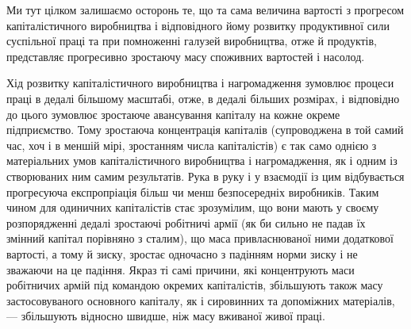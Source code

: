 Ми тут цілком залишаємо осторонь те, що та сама величина
вартості з прогресом капіталістичного виробництва і відповідного
йому розвитку продуктивної сили суспільної праці та при помноженні
галузей виробництва, отже й продуктів, представляє прогресивно
зростаючу масу споживних вартостей і насолод.

Хід розвитку капіталістичного виробництва і нагромадження
зумовлює процеси праці в дедалі більшому масштабі, отже, в дедалі
більших розмірах, і відповідно до цього зумовлює зростаюче
авансування капіталу на кожне окреме підприємство. Тому
зростаюча концентрація капіталів (супроводжена в той самий
час, хоч і в меншій мірі, зростанням числа капіталістів) є так
само однією з матеріальних умов капіталістичного виробництва
і нагромадження, як і одним із створюваних ним самим результатів.
Рука в руку і у взаємодії із цим відбувається прогресуюча експропріація
більш чи менш безпосередніх виробників. Таким чином
для одиничних капіталістів стає зрозумілим, що вони мають
у своєму розпорядженні дедалі зростаючі робітничі армії (як би
сильно не падав їх змінний капітал порівняно з сталим), що маса
привласнюваної ними додаткової вартості, а тому й зиску, зростає
одночасно з падінням норми зиску і не зважаючи на це падіння.
Якраз ті самі причини, які концентрують маси робітничих армій
під командою окремих капіталістів, збільшують також масу застосовуваного
основного капіталу, як і сировинних та допоміжних
матеріалів, — збільшують відносно швидше, ніж масу вживаної
живої праці.
